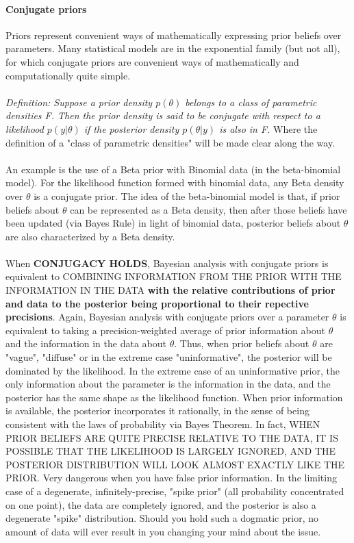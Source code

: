 \documentclass {article}
\begin{document}
\paragraph{Conjugate priors}
Priors represent convenient ways of mathematically expressing prior beliefs over parameters.
 Many statistical models are in the exponential family (but not all), for which conjugate priors are convenient ways of mathematically and computationally quite simple.
\\
\\
\textit{Definition: Suppose a prior density $p(\theta)$ belongs to a class of parametric densities F.
Then the prior density is said to be conjugate with respect to a likelihood $p(y|\theta)$ if the posterior density $p(\theta | y)$ is also in F.}  
Where the definition of a "class of parametric densities" will be made clear along the way.
\\
\\
An example is the use of a Beta prior with Binomial data (in the beta-binomial model).
 For the likelihood function formed with binomial data, any Beta density over $\theta$ is a conjugate prior.
 The idea of the beta-binomial model is that, if prior beliefs about $\theta$ can be represented as a Beta density, then after those beliefs have been updated (via Bayes Rule) in light of binomial data, posterior beliefs about $\theta$ are also characterized by a Beta density.  
\\
\\
When  \textbf{CONJUGACY HOLDS}, Bayesian analysis with conjugate priors is equivalent to COMBINING INFORMATION FROM THE PRIOR WITH THE INFORMATION IN THE DATA \textbf{with the relative contributions of prior and data to the posterior being proportional to their repective precisions}. 
Again, Bayesian analysis with conjugate priors over a parameter $\theta$ is equivalent to taking a precision-weighted average of prior information about $\theta$ and the information in the data about $\theta$.
Thus, when prior beliefs about $\theta$ are "vague", "diffuse" or in the extreme case "uninformative", the posterior will be dominated by the likelihood.
In the extreme case of an uninformative prior, the only information about the parameter is the information in the data, and the posterior has the same shape as the likelihood function. 
When prior information is available, the posterior incorporates it rationally, in the sense of being consistent with the laws of probability via Bayes Theorem.
 In fact, WHEN PRIOR BELIEFS ARE QUITE PRECISE RELATIVE TO THE DATA, IT IS POSSIBLE THAT THE LIKELIHOOD IS LARGELY IGNORED, AND THE POSTERIOR DISTRIBUTION WILL LOOK ALMOST EXACTLY LIKE THE PRIOR.
 Very dangerous when you have false prior information.
In the limiting case of a degenerate, infinitely-precise, "spike prior" (all probability concentrated on one point), the data are completely ignored, and the posterior is also a degenerate "spike" distribution. Should you hold such a dogmatic prior, no amount of data will ever result in you changing your mind about the issue. 
\end{document}
